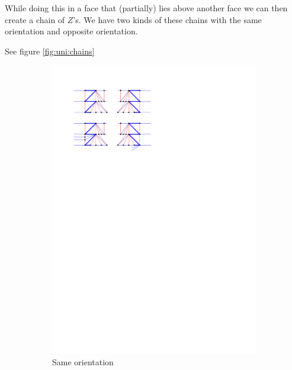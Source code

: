     While doing this in a face that (partially) lies above another face we can then create a chain of $Z$'s. We have two kinds of these chains with the same orientation and opposite orientation.

    See figure \ref{fig:uni:chains}

    \begin{figure}
      \centering
      \begin{subfigure}[b]{0.45 \textwidth}
          \includegraphics[width = \textwidth]{unifiedAlgo/img/post/sameChain}
          \caption{Same orientation}
      \end{subfigure}
      ~
      \begin{subfigure}[b]{0.45 \textwidth}

\end{subfigure}
\end{figure}
